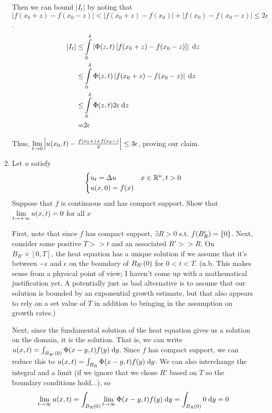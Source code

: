 \begin{enumerate}
  Then we can bound $|I_t|$ by noting that $|f(x_0 + z) - f(x_0 - z)| < |f(x_0 + z) - f(x_0)| + |f(x_0) - f(x_0 - z)| \leq 2 \epsilon$.
  \begin{align*}
  |I_t| \leq &\int \limits_{0}^{\delta} \left| \Phi(z, t) \left[ f(x_0 + z) - f(x_0 - z) \right] \right| \dz\\
        \leq &\int \limits_{0}^{\delta} \Phi(z, t) \left| f(x_0 + z) - f(x_0 - z) \right| \dz\\
        \leq &\int \limits_{0}^{\delta} \Phi(z, t) 2 \epsilon \dz\\
        = & 2 \epsilon\\
  \end{align*}

  Thus, $\limitto{t}{0} \left|u(x_0, t) - \frac{f(x_0+) + f(x_0-)}{2}\right| \leq 3 \epsilon$,
  proving our claim.

\item
  Let $u$ satisfy
  $$
  \begin{cases}
    u_t = \Delta u & x \in \reals^n, t > 0\\
    u(x, 0) = f(x)
  \end{cases}
  $$
  Suppose that $f$ is continuous and has compact support.
  Show that $\limitto{t}{+\infty} u(x, t) = 0$ for all $x$

  First, note that since $f$ has compact support, $\exists R > 0$ s.t.
  $f(B_R^c) = \set{0}$.
  Next, consider some positive $T >> t$ and an associated $R' >> R$.
  On $B_{R'} \times [0, T]$, the heat equation has a unique solution if we assume that it's between
  $-\epsilon$ and $\epsilon$ on the boundary of $\ball{0}{R'}$ for $0 < t < T$.
  (n.b. This makes sense from a physical point of view; I haven't come up with a mathematical justification yet.
  A potentially just as bad alternative is to assume that our solution is bounded by an exponential growth estimate,
  but that also appears to rely on a set value of $T$ in addition to bringing in the assumption on growth rates.)

  Next, since the fundamental solution of the heat equation gives us a solution on the domain, it is the solution.
  That is, we can write $u(x, t) = \int_{\ball{0}{R'}} \Phi(x - y, t) f(y) \dy$.
  Since $f$ has compact support, we can reduce this to $u(x, t) = \int_{B_R} \Phi(x - y, t) f(y) \dy$.
  We can also interchange the integral and a limit (if we ignore that we chose $R'$ based on $T$ so the boundary conditions hold...), so
  $$
  \limitto{t}{\infty} u(x, t) = \int_{\ball{0}{R}} \limitto{t}{\infty} \Phi(x - y, t) f(y) \dy = \int_{\ball{0}{R}} 0 \dy = 0
  $$

\end{enumerate}
